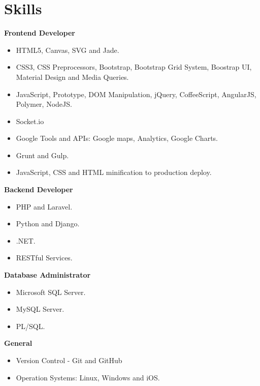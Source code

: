 \documentclass[]{friggeri-cv} %
\begin{document}
\section{Skills}

\textbf{Frontend Developer}

\begin{itemize}
	\item HTML5, Canvas, SVG and Jade.
	\item CSS3, CSS Preprocessors, Bootstrap, Bootstrap Grid System, Boostrap UI, Material Design and Media Queries.
	\item JavaScript, Prototype, DOM Manipulation, jQuery, CoffeeScript, AngularJS, Polymer, NodeJS.
	\item Socket.io
	\item Google Tools and APIs: Google maps, Analytics, Google Charts.
	\item Grunt and Gulp.
	\item JavaScript, CSS and HTML minification to production deploy.
\end{itemize}

\textbf{Backend Developer}
\begin{itemize}
	\item PHP and Laravel.
	\item Python and Django. 
	\item .NET.
	\item RESTful Services.
\end{itemize}

\textbf{Database Administrator}
\begin{itemize}
	\item Microsoft SQL Server.
	\item MySQL Server.
	\item PL/SQL.
\end{itemize}

\textbf{General}
\begin{itemize}
	\item Version Control - Git and GitHub
	\item Operation Systems: Linux, Windows and iOS.
\end{itemize}

\end{document}
